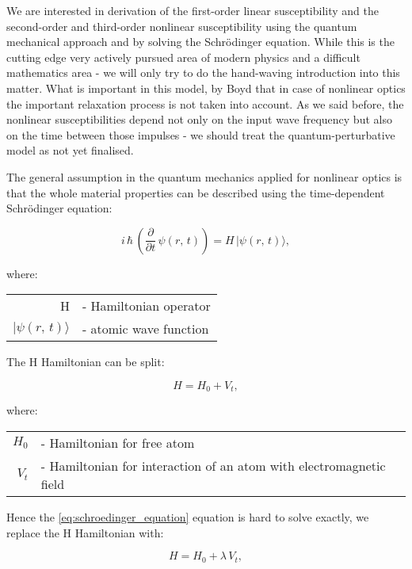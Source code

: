 \documentclass[12pt,twoside,a4paper]{article}
\numberwithin{equation}{subsection}
\numberwithin{figure}{subsection}
\newcommand{\ket}[1]{|#1\rangle}
\begin{document}
We are interested in derivation of the first-order linear susceptibility and the second-order and third-order nonlinear
susceptibility using the quantum mechanical approach and by solving the Schrödinger equation. While this is the cutting edge very
actively pursued area of modern physics and a difficult mathematics area - we will only try to do the hand-waving introduction into
this matter. What is important in this model, by Boyd \cite{boyd_nlo} that in case of nonlinear optics the important relaxation
process is not taken into account. As we said before, the nonlinear susceptibilities depend not only on the input wave
frequency but also on the time between those impulses - we should treat the quantum-perturbative model as not yet finalised.


The general assumption in the quantum mechanics applied for nonlinear optics is that the whole material properties can be described
using the time-dependent Schrödinger equation:

\begin{equation} \label{eq:schroedinger_equation}
  i\,\hbar\,({\frac {\partial }{\partial t}}\,\psi (r, \,t))=H\, \ket{ \psi(r, \,t) },
\end{equation}

where: 

\begin{tabular}{ r l}
  H & - Hamiltonian operator \\
  $\ket{\psi(r,\,t)}$ & - atomic wave function \\
\end{tabular}


The H Hamiltonian can be split:

\begin{equation} \label{eq:schroedinger_hamiltonian}
  H={H_{0}} + {V_{t}},
\end{equation}

where:

\begin{tabular} {r l}
  ${H_{0}}$ & - Hamiltonian for free atom \\
  ${V_{t}}$ & - Hamiltonian for interaction of an atom with electromagnetic field \\
\end{tabular}


Hence the \ref{eq:schroedinger_equation} equation is hard to solve exactly, we replace the H Hamiltonian with:

\begin{equation} \label{eq:shamiltionian_replaced}
  H = {H_{0}} + \lambda \,{V_{t}},
\end{equation}
\end{document}
